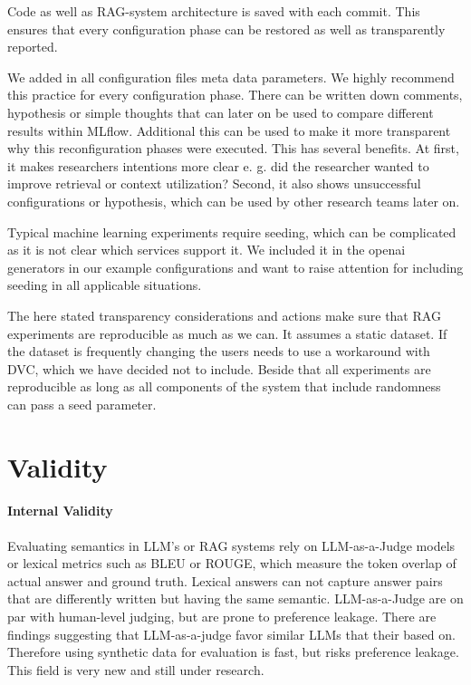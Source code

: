 Code as well as RAG-system architecture is saved with each commit. This ensures that every configuration phase can be restored as well as transparently reported. 

We added in all configuration files meta data parameters. We highly recommend this practice for every configuration phase. There can be written down comments, hypothesis or simple thoughts that can later on be used to compare different results within MLflow. Additional this can be used to make it more transparent why this reconfiguration phases were executed. This has several benefits.
At first, it makes researchers intentions more clear e. g. did the researcher wanted to improve retrieval or context utilization? 
Second, it also shows unsuccessful configurations or hypothesis, which can be used by other research teams later on.

Typical machine learning experiments require seeding, which can be complicated as it is not clear which services support it. We included it in the openai generators in our example configurations and want to raise attention for including seeding in all applicable situations.

The here stated transparency considerations and actions make sure that RAG experiments are reproducible as much as we can. It assumes a static dataset. If the dataset is frequently changing the users needs to use a workaround with DVC, which we have decided not to include.
Beside that all experiments are reproducible as long as all components of the system that include randomness can pass a seed parameter.

\section{Validity}

\paragraph{Internal Validity}
Evaluating semantics in LLM's or RAG systems rely on LLM-as-a-Judge models or lexical metrics such as BLEU or ROUGE, which measure the token overlap of actual answer and ground truth. Lexical answers can not capture answer pairs that are differently written but having the same semantic. LLM-as-a-Judge are on par with human-level judging, but are prone to preference leakage. There are findings suggesting that LLM-as-a-judge favor similar LLMs that their based on. Therefore using synthetic data for evaluation is fast, but risks preference leakage.\cite{Li.03.02.2025} This field is very new and still under research. 

